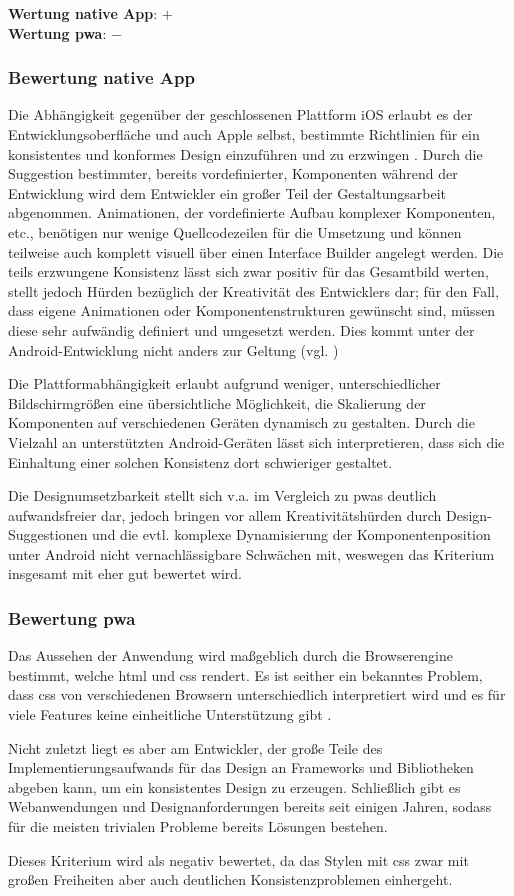 \textbf{Wertung native App}: $+$ \\
\textbf{Wertung \ac{pwa}}: $-$

\subsubsection{Bewertung native App}
Die Abhängigkeit gegenüber der geschlossenen Plattform iOS erlaubt es der Entwicklungsoberfläche und auch Apple selbst, bestimmte Richtlinien für ein konsistentes und konformes Design einzuführen und zu erzwingen \cite{AppleDesign}. Durch die Suggestion bestimmter, bereits vordefinierter, Komponenten während der Entwicklung wird dem Entwickler ein großer Teil der Gestaltungsarbeit abgenommen. Animationen, der vordefinierte Aufbau komplexer Komponenten, etc., benötigen nur wenige Quellcodezeilen für die Umsetzung und können teilweise auch komplett visuell über einen Interface Builder angelegt werden. Die teils erzwungene Konsistenz lässt sich zwar positiv für das Gesamtbild werten, stellt jedoch Hürden bezüglich der Kreativität des Entwicklers dar; für den Fall, dass eigene Animationen oder Komponentenstrukturen gewünscht sind, müssen diese sehr aufwändig definiert und umgesetzt werden. Dies kommt unter der Android-Entwicklung nicht anders zur Geltung (vgl. \cite{AndroidDesign})

Die Plattformabhängigkeit erlaubt aufgrund weniger, unterschiedlicher Bildschirmgrößen eine übersichtliche Möglichkeit, die Skalierung der Komponenten auf verschiedenen Geräten dynamisch zu gestalten. Durch die Vielzahl an unterstützten Android-Geräten lässt sich interpretieren, dass sich die Einhaltung einer solchen Konsistenz dort schwieriger gestaltet.

Die Designumsetzbarkeit stellt sich v.a. im Vergleich zu \acp{pwa} deutlich aufwandsfreier dar, jedoch bringen vor allem Kreativitätshürden durch Design-Suggestionen und die evtl. komplexe Dynamisierung der Komponentenposition unter Android nicht vernachlässigbare Schwächen mit, weswegen das Kriterium insgesamt mit eher gut bewertet wird.

\subsubsection{Bewertung \ac{pwa}}
Das Aussehen der Anwendung wird maßgeblich durch die Browserengine bestimmt, welche \ac{html} und \ac{css} rendert. Es ist seither ein bekanntes Problem, dass \ac{css} von verschiedenen Browsern unterschiedlich interpretiert wird und es für viele Features keine einheitliche Unterstützung gibt \cite{MozillaHandlingCommonHTMLCSSProblems}.

Nicht zuletzt liegt es aber am Entwickler, der große Teile des Implementierungsaufwands für das Design an Frameworks und Bibliotheken abgeben kann, um ein konsistentes Design zu erzeugen.  Schließlich gibt es Webanwendungen und Designanforderungen bereits seit einigen Jahren, sodass für die meisten trivialen Probleme bereits Lösungen bestehen.

Dieses Kriterium wird als negativ bewertet, da das Stylen mit \ac{css} zwar mit großen Freiheiten aber auch deutlichen Konsistenzproblemen einhergeht.